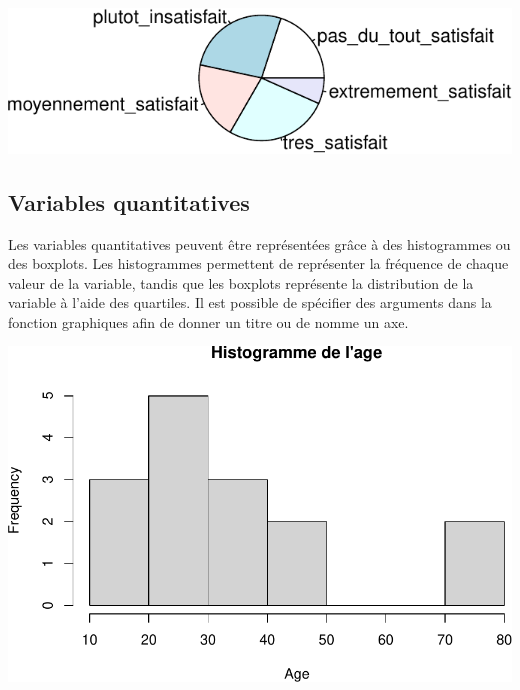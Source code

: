 \documentclass[
]{book}
\newenvironment{Shaded}{\begin{snugshade}}{\end{snugshade}}
\newcommand{\AttributeTok}[1]{\textcolor[rgb]{0.13,0.29,0.53}{#1}}
\newcommand{\FunctionTok}[1]{\textcolor[rgb]{0.13,0.29,0.53}{\textbf{#1}}}
\newcommand{\NormalTok}[1]{#1}
\newcommand{\SpecialCharTok}[1]{\textcolor[rgb]{0.81,0.36,0.00}{\textbf{#1}}}
\newcommand{\StringTok}[1]{\textcolor[rgb]{0.31,0.60,0.02}{#1}}
\begin{document}
\includegraphics{_main_files/figure-latex/unnamed-chunk-53-4.pdf}

\subsection{Variables quantitatives}\label{variables-quantitatives-1}

Les variables quantitatives peuvent être représentées grâce à des histogrammes ou des boxplots. Les histogrammes permettent de représenter la fréquence de chaque valeur de la variable, tandis que les boxplots représente la distribution de la variable à l'aide des quartiles. Il est possible de spécifier des arguments dans la fonction graphiques afin de donner un titre ou de nomme un axe.

\begin{Shaded}
\end{Shaded}

\includegraphics{_main_files/figure-latex/unnamed-chunk-54-1.pdf}
\end{document}
